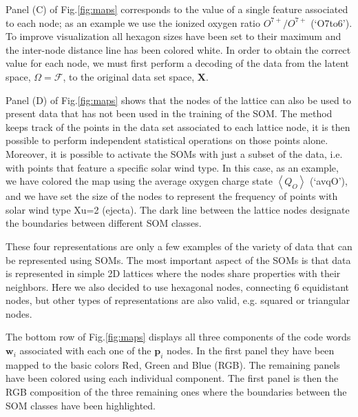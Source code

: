 Panel (C) of Fig.\ref{fig:maps} corresponds to the value of a single feature associated to each node; as an example we use the ionized oxygen ratio $O^{7+}/O^{7+}$ (`O7to6'). To improve visualization all hexagon sizes have been set to their maximum and the inter-node distance line has been colored white. In order to obtain the correct value for each node, we must first perform a decoding of the data from the latent space, $\Omega=\boldsymbol{\mathcal{F}}$, to the original data set space, $\boldsymbol{X}$.

Panel (D) of Fig.\ref{fig:maps} shows that the nodes of the lattice can also be used to present data that has not been used in the training of the SOM. The method keeps track of the points in the data set associated to each lattice node, it is then possible to perform independent statistical operations on those points alone. Moreover, it is possible to activate the SOMs with just a subset of the data, i.e. with points that feature a specific solar wind type. In this case, as an example, we have colored the map using the average oxygen charge state $\left<Q_{O}\right>$ (`avqO'), and we have set the size of the nodes to represent the frequency of points with solar wind type Xu=2 (ejecta). The dark line between the lattice nodes designate the boundaries between different SOM classes.

These four representations are only a few examples of the variety of data that can be represented using SOMs. The most important aspect of the SOMs is that data is represented in simple 2D lattices where the nodes share properties with their neighbors. Here we also decided to use hexagonal nodes, connecting 6 equidistant nodes, but other types of representations are also valid, e.g. squared or triangular nodes.

The bottom row of Fig.\ref{fig:maps} displays all three components of the code words $\boldsymbol{w}_i$ associated with each one of the $\boldsymbol{p}_i$ nodes. In the first panel they have been mapped to the basic colors Red, Green and Blue (RGB). The remaining panels have been colored using each individual component. The first panel is then the RGB composition of the three remaining ones where the boundaries between the SOM classes have been highlighted.

